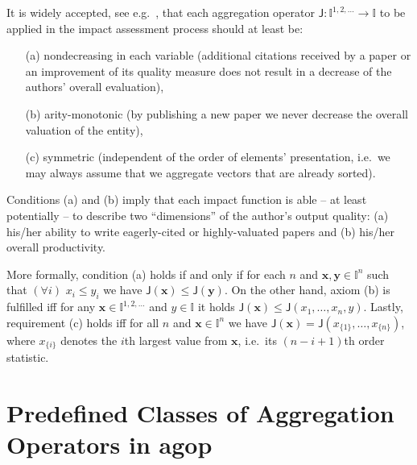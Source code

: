 \documentclass[11pt]{article}\usepackage{graphicx, color}
\newcommand{\package}[1]{\textsf{#1}\xspace}
\newcommand{\vect}[1]{{\mathbf{#1}}}
\newcommand{\func}[1]{{\mathsf{#1}}}
\newcommand{\Ival}{\mathbb{I}}
\newcommand{\IvalPow}[1]{\mathbb{I}^{#1}}
\newcommand{\AnyPow}{^{1,2,\dots}}
\newcommand{\IvalAnyPow}{\mathbb{I}\AnyPow}
\theoremstyle{remark}
\theoremstyle{definition}
\begin{document}
It is widely accepted, see e.g.~\cite{Woeginger2008:axiomatich,
Woeginger2008:axiomaticg,
Woeginger2008:symmetryaxiom,Rousseau2008:woegingerax,Quesada2009:monotonicityh,
Quesada2010:moreaxiomatics,GagolewskiGrzegorzewski2011:ijar,
Gagolewski2011:PhD,FranceschiniMaisano2011:structevalh},
that each aggregation operator
 $\func{J}:\IvalAnyPow\to\Ival$ to be applied in the impact assessment
 process  should at least be:
\begin{enumerate}
   \item[(a)] nondecreasing in each variable (additional
   citations received by a paper or an improvement
   of its quality measure does not result
   in a decrease of the authors' overall evaluation),
   \item[(b)] arity-monotonic (by publishing a new paper we
   never decrease the overall valuation of the entity),
   \item[(c)] symmetric (independent
of the order of elements' presentation, i.e.~we may always assume that
we aggregate vectors that are already sorted).
\end{enumerate}
Conditions (a) and (b) imply that each impact function
is able -- at least potentially -- to describe two ``dimensions''
of the author's output quality: (a) his/her ability to write
eagerly-cited or highly-valuated papers and (b) his/her overall productivity.

More formally, condition (a) holds if and only if for each
$n$ and $\vect{x},\vect{y}\in\IvalPow{n}$ such that $(\forall i)$
$x_i\le y_i$ we have $\func{J}(\vect{x})\le\func{J}(\vect{y})$.
On the other hand, axiom (b) is fulfilled iff
for any $\vect{x}\in\IvalAnyPow$ and $y\in\Ival$ it holds
$\func{J}(\vect{x})\le\func{J}(x_1,\dots,x_n,y)$.
Lastly, requirement (c) holds iff for all $n$ and $\vect{x}\in\IvalPow{n}$
we have $\func{J}(\vect{x})=\func{J}(x_{\{1\}},\dots,x_{\{n\}})$,
where $x_{\{i\}}$ denotes the $i$th largest value from $\vect{x}$,
i.e.~its $(n-i+1)$th order statistic.








\section{Predefined Classes of Aggregation Operators in \package{agop}}
\end{document}
